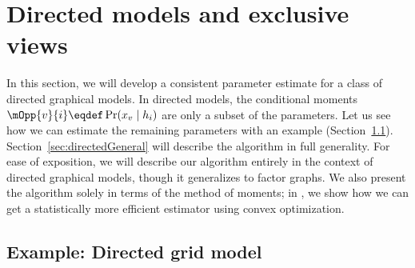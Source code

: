 \section{Directed models and exclusive views}
\label{sec:directed}




  In this section, we will develop a consistent parameter estimate for a class of directed graphical models.
  In directed models, the conditional moments $\mOpp{v}{i} \eqdef \Pr(x_v \mid h_i)$
  are only a subset of the parameters.
  Let us see how we can estimate the remaining parameters with an example (Section~\ref{sec:directedExample}).
  Section~\ref{sec:directedGeneral} will describe the algorithm in full generality.
For ease of exposition, we will describe our algorithm entirely in the
  context of directed graphical models, though it generalizes to factor
  graphs.
We also present the algorithm solely in terms of the method of moments; in
  , we show how we can get a statistically more
  efficient estimator using convex optimization.

\subsection{Example: Directed grid model}
\label{sec:directedExample}

%  

